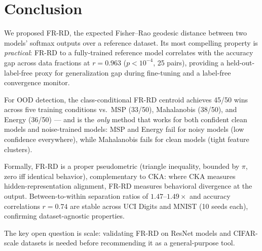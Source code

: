 \documentclass[11pt]{article}
\begin{document}
\section{Conclusion}

We proposed FR-RD, the expected Fisher--Rao geodesic distance between two models' softmax
outputs over a reference dataset. Its most compelling property is \emph{practical}: FR-RD
to a fully-trained reference model correlates with the accuracy gap across data fractions
at $r = 0.963$ ($p < 10^{-4}$, 25 pairs), providing a held-out-label-free proxy for
generalization gap during fine-tuning and a label-free convergence monitor.

For OOD detection, the class-conditional FR-RD centroid achieves 45/50 wins across five
training conditions vs.\ MSP (33/50), Mahalanobis (38/50), and Energy (36/50) — and is
the \emph{only} method that works for both confident clean models and noise-trained models:
MSP and Energy fail for noisy models (low confidence everywhere), while Mahalanobis
fails for clean models (tight feature clusters).

Formally, FR-RD is a proper pseudometric (triangle inequality, bounded by $\pi$, zero iff
identical behavior), complementary to CKA: where CKA measures hidden-representation
alignment, FR-RD measures behavioral divergence at the output. Between-to-within separation
ratios of $1.47$--$1.49\times$ and accuracy correlations $r = 0.74$ are stable across UCI
Digits and MNIST (10 seeds each), confirming dataset-agnostic properties.

The key open question is scale: validating FR-RD on ResNet models and CIFAR-scale datasets
is needed before recommending it as a general-purpose tool.



\end{document}
